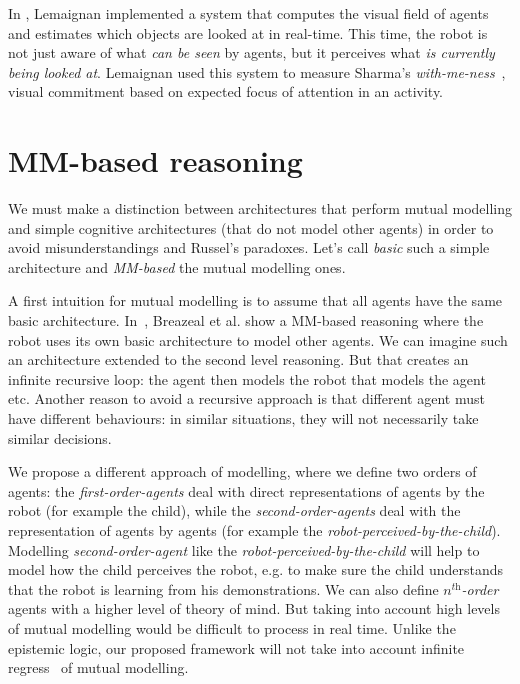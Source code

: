\documentclass[conference]{IEEEtran}
\begin{document}
In \cite{lemaignan2016realtime}, Lemaignan implemented a system that computes the visual field of agents and estimates which objects are looked at in real-time. This time, the robot is not just aware of what \textit{can be seen} by agents, but it perceives what \textit{is currently being looked at}. Lemaignan used this system to measure Sharma's \textit{with-me-ness}~\cite{sharma2014me}, visual commitment based on expected focus of attention in an activity. 

\section{MM-based reasoning}
We must make a distinction between architectures that perform mutual modelling and simple cognitive architectures (that do not model other agents) in order to avoid misunderstandings and Russel's paradoxes.
Let's call \textit{basic} such a simple architecture and \textit{MM-based} the mutual modelling ones. 

A first intuition for mutual modelling is to assume that all agents have the same basic architecture. In~\cite{breazeal2009embodied}, Breazeal et al. show a MM-based reasoning where the robot uses its own basic architecture to model other agents. We can imagine such an architecture extended to the second level reasoning. But that creates an infinite recursive loop: the agent then models the robot that models the agent etc. Another reason to avoid a recursive approach is that different agent must have different behaviours: in similar situations, they will not necessarily take similar decisions. 

We propose a different approach of modelling, where we define two orders of agents: the \textit{first-order-agents} deal with direct representations of agents by the robot (for example the child), while the \textit{second-order-agents} deal with the representation of agents by agents (for example the \textit{robot-perceived-by-the-child}). 
Modelling \textit{second-order-agent} like the \textit{robot-perceived-by-the-child} will help to model how the child perceives the robot, e.g. to make sure the child understands that the robot is learning from his demonstrations. 
We can also define \textit{$n^{\textit{th}}$-order} agents with a higher level of theory of mind. But taking into account high levels of mutual modelling would be difficult to process in real time. Unlike the epistemic logic, our proposed framework will not take into account infinite regress~\cite{clark1991grounding} of mutual modelling.
\end{document}
